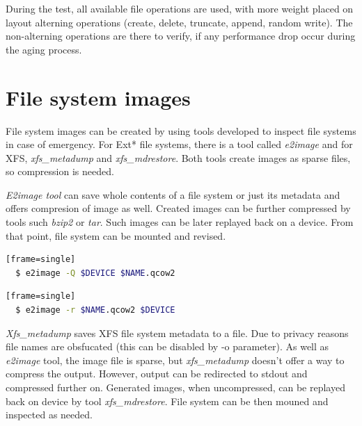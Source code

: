 \documentclass[
  color, %
  table, %
  lof,   %
  lot,   %
]{fithesis3}
\begin{document}
During the test, all available file operations are used, with more weight placed on layout alterning operations (create, delete, truncate, append, random write). The non-alterning operations are there to verify, if any performance drop occur during the aging process.

\section{File system images}
File system images can be created by using tools developed to inspect file systems in case of emergency. For Ext* file systems, there is a tool called \textit{e2image} and for XFS, \textit{xfs\_metadump} and \textit{xfs\_mdrestore}. Both tools create images as sparse files, so compression is needed.

\textit{E2image tool} can save whole contents of a file system or just its metadata and offers compresion of image as well. Created images can be further compressed by tools such \textit{bzip2} or \textit{tar}. Such images can be later replayed back on a device. From that point, file system can be mounted and revised.


\begin{lstlisting}[language=bash, caption={Creating compressed image using \textit{e2image}}][frame=single]
  $ e2image -Q $DEVICE $NAME.qcow2
\end{lstlisting}

\begin{lstlisting}[language=bash, caption={Reloading compressed image}][frame=single]
  $ e2image -r $NAME.qcow2 $DEVICE
\end{lstlisting}

\textit{Xfs\_metadump} saves XFS file system metadata to a file. Due to privacy reasons file names are obsfucated (this can be disabled by -o parameter). As well as \textit{e2image} tool, the image file is sparse, but \textit{xfs\_metadump} doesn't offer a way to compress the output. However, output can be redirected to stdout and compressed further on. Generated images, when uncompressed, can be replayed back on device by tool \textit{xfs\_mdrestore}. File system can be then mouned and inspected as needed.
\end{document}

